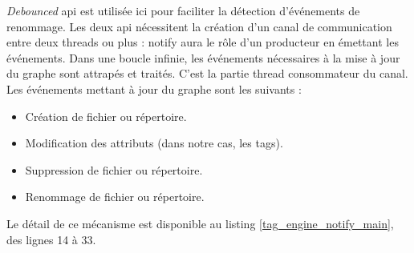 \textit{Debounced} \acrshort{api} est utilisée ici pour faciliter la détection d'événements de 
renommage. Les deux \acrshort{api} nécessitent la création d'un canal de communication entre deux 
threads ou plus : notify aura le rôle d'un producteur en émettant les événements. Dans une boucle 
infinie, les événements nécessaires à la mise à jour du graphe sont attrapés et traités. C'est la 
partie thread consommateur du canal. Les événements mettant à jour du graphe sont les suivants :
\begin{itemize}
    \item Création de fichier ou répertoire.
    \item Modification des attributs (dans notre cas, les tags).
    \item Suppression de fichier ou répertoire. 
    \item Renommage de fichier ou répertoire.
\end{itemize}
Le détail de ce mécanisme est disponible au listing \ref{tag_engine_notify_main}, des lignes 14 à 33.


